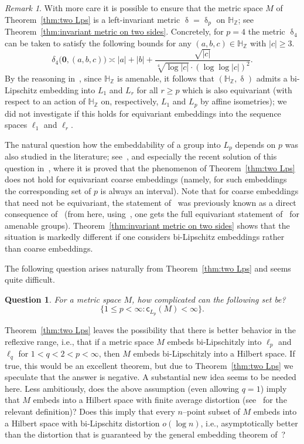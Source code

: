 \documentclass[11pt,reqno]{amsart}
\renewcommand{\H}{\mathbb{H}}
\newcommand{\Z}{\mathbb{Z}}
\newcommand{\cc}{{\mathsf{c}}}
\newcommand{\0}{\mathbf{0}}
\renewcommand{\1}{\mathbf 1}
\renewcommand{\ge}{\geqslant}
\renewcommand{\le}{\leqslant}
\newtheorem{question}[thm]{Question}
\theoremstyle{remark}
\newtheorem{remark}[thm]{Remark}
\begin{document}
\begin{remark} With more care it is possible to ensure that the metric space $M$ of Theorem~\ref{thm:two Lps} is  a left-invariant metric $\updelta=\updelta_p$ on $\H_\Z$; see  Theorem~\ref{thm:invariant metric on two sides}. Concretely, for $p=4$ the metric $\updelta_4$ can be taken to satisfy the following bounds for any $(a,b,c)\in \H_\Z$ with $|c|\ge 3$.
$$
\delta_4\big(\0,(a,b,c)\big)\asymp |a|+|b|+\frac{\sqrt{|c|}}{\sqrt[4]{\log |c|}\cdot (\log\log |c|)^2}.
$$
By the reasoning in~\cite[Section~9]{NP11}, since $\H_\Z$ is amenable, it follows that $(\H_\Z,\updelta)$ admits a bi-Lipschitz embedding into $L_1$ and $L_r$ for all $r\ge p$ which is also equivariant (with respect to an action of $\H_\Z$ on, respectively, $L_1$ and $L_p$ by affine isometries); we did not investigate if this holds for equivariant embeddings into the sequence spaces $\ell_1$ and $\ell_r$.

The natural question how the embeddability of a group into $L_p$ depends on $p$ was also studied in the literature; see~\cite{CDH10,Czu17}, and especially the recent solution of this question in~\cite{MS20}, where it is proved that the phenomenon of Theorem~\ref{thm:two Lps} does not hold for equivariant coarse embeddings (namely, for such embeddings the corresponding set of $p$ is always an interval). Note that for coarse embeddings that need not be equivariant, the statement of~\cite{MS20} was previously known as a direct consequence of~\cite[Remark~5.10]{MN04} (from here, using~\cite{NP11}, one gets the full equivariant statement of~\cite{MS20}  for amenable groups). Theorem~\ref{thm:invariant metric on two sides} shows that the situation is markedly different if one considers bi-Lipschitz embeddings rather than coarse embeddings.
\end{remark}




The following question arises naturally from Theorem~\ref{thm:two Lps} and seems quite difficult.

\begin{question}\label{Q:crazy set}
For a metric space $M$, how complicated can the following set be?
$$\big\{1\le p<\infty: \cc_{L_p}(M)<\infty\big\}.$$
\end{question}

Theorem~\ref{thm:two Lps} leaves the possibility that there is better behavior in the reflexive range, i.e., that if a metric space $M$ embeds bi-Lipschitzly into  $\ell_p$ and $\ell_q$ for $1<q<2<p<\infty$, then $M$  embeds bi-Lipschitzly into a Hilbert space. If true, this would be an excellent theorem, but due to Theorem~\ref{thm:two Lps} we speculate that the answer is negative. A substantial new idea seems to be needed here. Less ambitiously, does the above assumption (even allowing $q=1$) imply that $M$ embeds into a Hilbert space with finite average distortion (see~\cite{Nao19} for the relevant definition)? Does this imply that every $n$--point subset of $M$ embeds into a Hilbert space with bi-Lipschitz distortion $o(\log n)$, i.e., asymptotically better than the distortion that is guaranteed by the general embedding theorem of~\cite{Bou85}?
\end{document}
